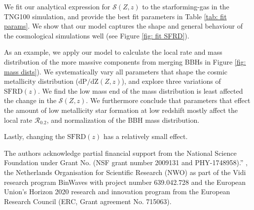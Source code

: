 \documentclass[twocolumn]{aastex631}
\newcommand{\SFRDzZ}{\ensuremath{\mathcal{S}(Z,z)}\xspace}
\newcommand{\SFRDz}{\ensuremath{\mathrm{SFRD}(z)}\xspace}
\newcommand{\dpdZ}{\ensuremath{\mathrm{dP/dZ}(Z,z)}\xspace}
\begin{document}
We fit our analytical expression for \SFRDzZ to the starforming-gas in the TNG100 simulation, and provide the best fit parameters in Table \ref{tab: fit params}. We show that our model captures the shape and general behaviour of the cosmological simulations well (see Figure \ref{fig: fit SFRD}). 

As an example, we apply our model to calculate the local rate and mass distribution of the more massive components from merging BBHs in Figure \ref{fig: mass dists}). 
We systematically vary all parameters that shape the cosmic metallicity distribution (\dpdZ), and explore three variations of \SFRDz. 
We find the low mass end of the mass distribution is least affected the change in the \SFRDzZ. 
%
We furthermore conclude that parameters that effect the amount of low metallicity star formation at low redshift mostly affect the local rate $\mathcal{R}_{0.2}$, and normalization of the BBH mass distribution.


%
Lastly, changing the \SFRDz has a relatively small effect.


\begin{acknowledgments}
The authors acknowledge partial financial support from the  National Science Foundation under Grant No. (NSF grant number 2009131  and PHY-1748958).”
, the Netherlands Organisation for Scientific Research (NWO) as part of the Vidi research program BinWaves with project number 639.042.728 and the European Union’s Horizon 2020 research and innovation program from the European Research Council (ERC, Grant agreement No. 715063). 
\end{acknowledgments}



\end{document}
